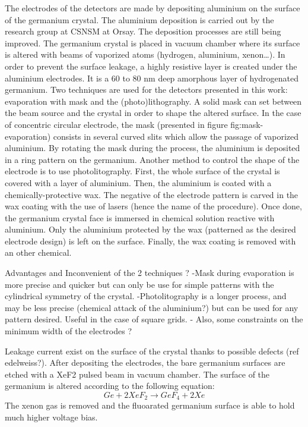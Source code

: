 
The electrodes of the detectors are made by depositing aluminium on the surface of the germanium crystal. The aluminium deposition is carried out by the research group at CSNSM at Orsay. The deposition processes are still being improved.
The germanium crystal is placed in vacuum chamber where its surface is altered with beams of vaporized atoms (hydrogen, aluminium, xenon…). 
In order to prevent the surface leakage, a highly resistive layer is created under the aluminium electrodes. It is a 60 to 80 nm deep amorphous layer of hydrogenated germanium.
Two techniques are used for the detectors presented in this work: evaporation with mask and the (photo)lithography.
A solid mask can set between the beam source and the crystal in order to shape the altered surface. In the case of concentric circular electrode, the mask (presented in figure {fig:mask-evaporation}) consists in several curved slits which allow the passage of vaporized aluminium. By rotating the mask during the process, the aluminium is deposited in a ring pattern on the germanium.
Another method to control the shape of the electrode is to use photolitography. First, the whole surface of the crystal is covered with a layer of aluminium. Then, the aluminium is coated with a chemically-protective wax. The negative of the electrode pattern is carved in the wax coating with the use of lasers (hence the name of the procedure). Once done, the germanium crystal face is immersed in chemical solution reactive with aluminium. Only the aluminium protected by the wax (patterned as the desired electrode design) is left on the surface. Finally, the wax coating is removed with an other chemical.

Advantages and Inconvenient of the 2 techniques ?
-Mask during evaporation is more precise and quicker but can only be use for simple patterns  with the cylindrical symmetry of the crystal.
-Photolitography is a longer process, and may be less precise (chemical attack of the aluminium?) but can be used for any pattern desired. Useful in the case of square grids.
- Also, some constraints on the minimum width of the electrodes ?

Leakage current exist on the surface of the crystal thanks to possible defects (ref edelweiss?). After depositing the electrodes, the bare germanium surfaces are etched with a XeF2 pulsed beam in vacuum chamber. The surface of the germanium is altered according to the following equation:
$$Ge + 2XeF_2 \longrightarrow GeF_4 + 2Xe$$
The xenon gas is removed and the fluoarated germanium surface is able to hold much higher voltage bias.

